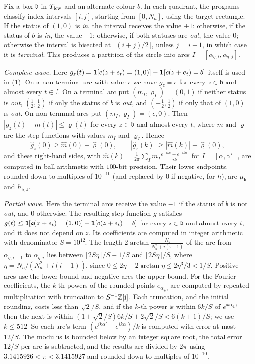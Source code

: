 \documentclass[11pt,colorlinks]{charlie}
\begin{document}
Fix a box $\mathfrak b$ in $T_{\rm low}$ and an alternate colour $b$. In each quadrant, the programs classify index intervals $[i,j]$, starting from $[0,N_a]$, using the target rectangle. If the status of $(1,0)$ is \emph{in}, the interval receives the value $+1$; otherwise, if the status of $b$ is \emph{in}, the value $-1$; otherwise, if both statuses are \emph{out}, the value $0$; otherwise the interval is bisected at $\lfloor(i+j)/2\rfloor$, unless $j=i+1$, in which case it is \emph{terminal}. This produces a partition of the circle into arcs $I=[\alpha_{q,i},\alpha_{q,j}]$.

\emph{Complete wave.} Here $g_z(t)=\mathbf{1}[c(z+e_t)=(1,0)]-\mathbf{1}[c(z+e_t)=b]$ itself is used in (1). On a non-terminal arc with value $\epsilon$ we have $g_z=\epsilon$ for every $z\in\mathfrak b$ and almost every $t\in I$. On a terminal arc put $(m_I,\varrho_I)=(0,1)$ if neither status is \emph{out}, $(\tfrac12,\tfrac12)$ if only the status of $b$ is \emph{out}, and $(-\tfrac12,\tfrac12)$ if only that of $(1,0)$ is \emph{out}. On non-terminal arcs put $(m_I,\varrho_I)=(\epsilon,0)$. Then $|g_z(t)-m(t)|\le\varrho(t)$ for every $z\in\mathfrak b$ and almost every $t$, where $m$ and $\varrho$ are the step functions with values $m_I$ and $\varrho_I$. Hence
\[
 \hat g_z(0)\ge\hat m(0)-\hat\varrho(0),\qquad |\hat g_z(k)|\ge|\hat m(k)|-\hat\varrho(0),
\]
and these right-hand sides, with $\hat m(k)=\frac1{2\pi}\sum_Im_I\frac{e^{-ik\alpha}-e^{-ik\alpha'}}{ik}$ for $I=[\alpha,\alpha']$, are computed in ball arithmetic with $100$-bit precision. Their lower endpoints, rounded down to multiples of $10^{-10}$ (and replaced by $0$ if negative, for $h$), are $\mu_{\mathfrak b}$ and $h_{\mathfrak b,k}$.

\emph{Partial wave.} Here the terminal arcs receive the value $-1$ if the status of $b$ is not \emph{out}, and $0$ otherwise. The resulting step function $g$ satisfies $g(t)\le\mathbf{1}[c(z+e_t)=(1,0)]-\mathbf{1}[c(z+e_t)=b]$ for every $z\in\mathfrak b$ and almost every $t$, and it does not depend on $z$. Its coefficients are computed in integer arithmetic with denominator $S=10^{12}$. The length $2\arctan\frac{N_a}{N_a^2+i(i-1)}$ of the arc from $\alpha_{q,i-1}$ to $\alpha_{q,i}$ lies between $\lfloor2S\eta\rfloor/S-1/S$ and $\lceil2S\eta\rceil/S$, where $\eta=N_a/(N_a^2+i(i-1))$, since $0\le2\eta-2\arctan\eta\le2\eta^3/3<1/S$. Positive arcs use the lower bound and negative arcs the upper bound. For the Fourier coefficients, the $k$-th powers of the rounded points $e_{\alpha_{q,i}}$ are computed by repeated multiplication with truncation to $S^{-1}\mathbb{Z}[\mathrm i]$. Each truncation, and the initial rounding, costs less than $\sqrt2/S$, and if the $k$-th power is within $6k/S$ of $e^{\mathrm ik\alpha_{q,i}}$ then the next is within $(1+\sqrt2/S)6k/S+2\sqrt2/S<6(k+1)/S$; we use $k\le512$. So each arc's term $(e^{ik\alpha'}-e^{ik\alpha})/k$ is computed with error at most $12/S$. The modulus is bounded below by an integer square root, the total error $12/S$ per arc is subtracted, and the results are divided by $2\pi$ using $3.1415926<\pi<3.1415927$ and rounded down to multiples of $10^{-10}$.
\end{document}
